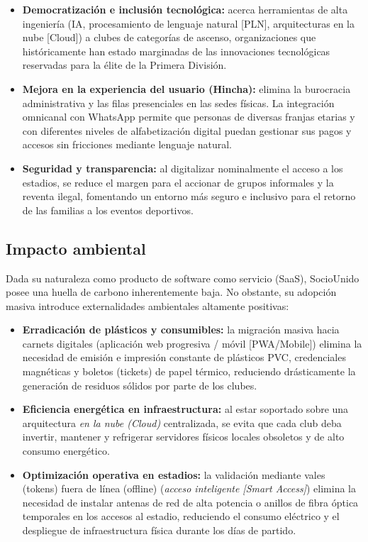 \begin{itemize}
    \item \textbf{Democratización e inclusión tecnológica:} acerca herramientas de alta ingeniería (IA, procesamiento de lenguaje natural [PLN], arquitecturas en la nube [Cloud]) a clubes de categorías de ascenso, organizaciones que históricamente han estado marginadas de las innovaciones tecnológicas reservadas para la élite de la Primera División.
    \item \textbf{Mejora en la experiencia del usuario (Hincha):} elimina la burocracia administrativa y las filas presenciales en las sedes físicas. La integración omnicanal con WhatsApp permite que personas de diversas franjas etarias y con diferentes niveles de alfabetización digital puedan gestionar sus pagos y accesos sin fricciones mediante lenguaje natural.
    \item \textbf{Seguridad y transparencia:} al digitalizar nominalmente el acceso a los estadios, se reduce el margen para el accionar de grupos informales y la reventa ilegal, fomentando un entorno más seguro e inclusivo para el retorno de las familias a los eventos deportivos.
\end{itemize}

\subsection{Impacto ambiental}

Dada su naturaleza como producto de software como servicio (SaaS), SocioUnido posee una huella de carbono inherentemente baja. No obstante, su adopción masiva introduce externalidades ambientales altamente positivas:

\begin{itemize}
    \item \textbf{Erradicación de plásticos y consumibles:} la migración masiva hacia carnets digitales (aplicación web progresiva / móvil [PWA/Mobile]) elimina la necesidad de emisión e impresión constante de plásticos PVC, credenciales magnéticas y boletos (tickets) de papel térmico, reduciendo drásticamente la generación de residuos sólidos por parte de los clubes.
    \item \textbf{Eficiencia energética en infraestructura:} al estar soportado sobre una arquitectura \textit{en la nube (Cloud)} centralizada, se evita que cada club deba invertir, mantener y refrigerar servidores físicos locales obsoletos y de alto consumo energético.
    \item \textbf{Optimización operativa en estadios:} la validación mediante vales (tokens) fuera de línea (offline) (\textit{acceso inteligente [Smart Access]}) elimina la necesidad de instalar antenas de red de alta potencia o anillos de fibra óptica temporales en los accesos al estadio, reduciendo el consumo eléctrico y el despliegue de infraestructura física durante los días de partido.
\end{itemize}

